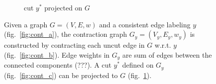 \begin{center}
\begin{figure}[h]
\begin{subfigure}[t]{0.4\linewidth}
{
    }
\caption{ cut $y^*$ projected on $G$}
\label{fig:cont_d}
\end{subfigure}
\hfill
\caption{
Given a graph $G=(V, E, w)$ and a consistent edge labeling $y$ (fig.~\ref{fig:cont_a}), the contraction 
graph  $G_y=(V_y,E_y, w_y) $ is constructed by contracting each uncut edge in $G$ w.r.t. $y$ (fig.~\ref{fig:cont_b}).
Edge weights in $G_y$ are sum of edges between the connected components (???).
A cut $y^*$ defined on $G_y$  (fig.~\ref{fig:cont_c}) can be projected to $G$ (fig.~\ref{fig:cont_d}).
}\label{fig:contraction}
\end{figure}
\end{center}



